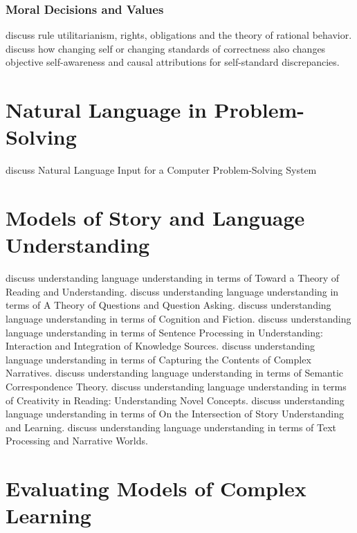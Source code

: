 \subsubsection{Moral Decisions and Values}

\cite{harsanyi:1980} discuss rule utilitarianism, rights, obligations and the theory of rational behavior.
\cite{duval:1999} discuss how changing self or changing standards of correctness also changes objective self-awareness and causal attributions for self-standard discrepancies.


\section{Natural Language in Problem-Solving}

\cite{bobrow:1968} discuss Natural Language Input for a Computer Problem-Solving System



\section{Models of Story and Language Understanding}


\cite{ram:1999a} discuss understanding language understanding in terms of Toward a Theory of Reading and Understanding.
\cite{ram:1999b} discuss understanding language understanding in terms of A Theory of Questions and Question Asking.
\cite{rapaport:1999} discuss understanding language understanding in terms of Cognition and Fiction.
\cite{mahesh:1999} discuss understanding language understanding in terms of Sentence Processing in Understanding: Interaction and Integration of Knowledge Sources.
\cite{domeshek:1999} discuss understanding language understanding in terms of Capturing the Contents of Complex Narratives.
\cite{peterson:1999} discuss understanding language understanding in terms of Semantic Correspondence Theory.
\cite{moorman:1999} discuss understanding language understanding in terms of Creativity in Reading: Understanding Novel Concepts.
\cite{cox:1999b} discuss understanding language understanding in terms of On the Intersection of Story Understanding and Learning.
\cite{gerrig:1999} discuss understanding language understanding in terms of Text Processing and Narrative Worlds.

\section{Evaluating Models of Complex Learning}


